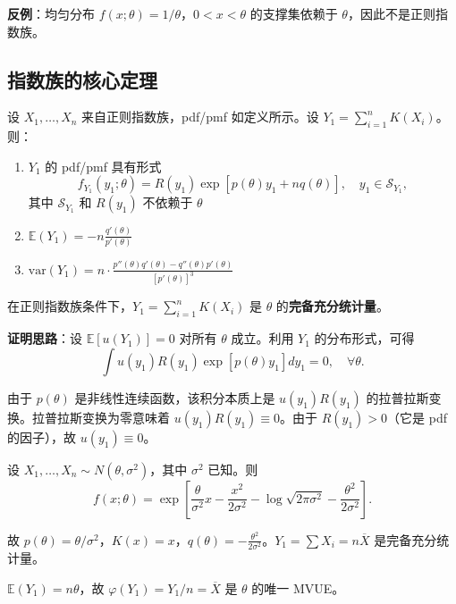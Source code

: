 \textbf{反例}：均匀分布 $f(x; \theta) = 1/\theta$，$0 < x < \theta$ 的支撑集依赖于 $\theta$，因此不是正则指数族。

\subsection{指数族的核心定理}

\begin{theorem}[指数族充分统计量的性质]\label{th:exponential-sufficient}
设 $X_1, \ldots, X_n$ 来自正则指数族，pdf/pmf 如定义所示。设 $Y_1 = \sum_{i=1}^n K(X_i)$。则：
\begin{enumerate}
\item $Y_1$ 的 pdf/pmf 具有形式
\[
f_{Y_1}(y_1; \theta) = R(y_1) \exp[p(\theta)y_1 + nq(\theta)],\quad y_1 \in \mathcal{S}_{Y_1},
\]
其中 $\mathcal{S}_{Y_1}$ 和 $R(y_1)$ 不依赖于 $\theta$
\item $\mathbb{E}(Y_1) = -n \frac{q'(\theta)}{p'(\theta)}$
\item $\text{var}(Y_1) = n \cdot \frac{p''(\theta)q'(\theta) - q''(\theta)p'(\theta)}{[p'(\theta)]^3}$
\end{enumerate}
\end{theorem}

\begin{theorem}[指数族统计量的完备性]\label{th:exponential-complete}
在正则指数族条件下，$Y_1 = \sum_{i=1}^n K(X_i)$ 是 $\theta$ 的\textbf{完备充分统计量}。
\end{theorem}

\textbf{证明思路}：设 $\mathbb{E}[u(Y_1)] = 0$ 对所有 $\theta$ 成立。利用 $Y_1$ 的分布形式，可得
\[
\int u(y_1)R(y_1) \exp[p(\theta)y_1] dy_1 = 0,\quad \forall \theta.
\]

由于 $p(\theta)$ 是非线性连续函数，该积分本质上是 $u(y_1)R(y_1)$ 的拉普拉斯变换。拉普拉斯变换为零意味着 $u(y_1)R(y_1) \equiv 0$。由于 $R(y_1) > 0$（它是 pdf 的因子），故 $u(y_1) \equiv 0$。

\begin{example}\label{ex:normal-mean-mvue}
设 $X_1, \ldots, X_n \sim N(\theta, \sigma^2)$，其中 $\sigma^2$ 已知。则
\[
f(x; \theta) = \exp\left[\frac{\theta}{\sigma^2}x - \frac{x^2}{2\sigma^2} - \log\sqrt{2\pi\sigma^2} - \frac{\theta^2}{2\sigma^2}\right].
\]

故 $p(\theta) = \theta/\sigma^2$，$K(x) = x$，$q(\theta) = -\frac{\theta^2}{2\sigma^2}$。$Y_1 = \sum X_i = n\overline{X}$ 是完备充分统计量。

$\mathbb{E}(Y_1) = n\theta$，故 $\varphi(Y_1) = Y_1/n = \overline{X}$ 是 $\theta$ 的唯一 MVUE。
\end{example}

